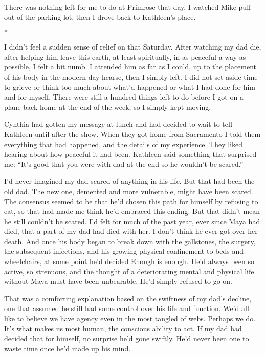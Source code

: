 \documentclass[12pt]{book}
\begin{document}
There was nothing left for me to do at Primrose that day. I watched Mike pull out of the parking lot, then I drove back to Kathleen's place.

\begin{center}$*$\end{center}

I didn't feel a sudden sense of relief on that Saturday. After watching my dad die, after helping him leave this earth, at least spiritually, in as peaceful a way as possible, I felt a bit numb. I attended him as far as I could, up to the placement of his body in the modern-day hearse, then I simply left. I did not set aside time to grieve or think too much about what'd happened or what I had done for him and for myself. There were still a hundred things left to do before I got on a plane back home at the end of the week, so I simply kept moving.

Cynthia had gotten my message at lunch and had decided to wait to tell Kathleen until after the show. When they got home from Sacramento I told them everything that had happened, and the details of my experience. They liked hearing about how peaceful it had been. Kathleen said something that surprised me: ``It's good that you were with dad at the end so he wouldn't be scared.''

I'd never imagined my dad scared of anything in his life. But that had been the old dad. The new one, demented and more vulnerable, might have been scared. The consensus seemed to be that he'd chosen this path for himself by refusing to eat, so that had made me think he'd embraced this ending. But that didn't mean he still couldn't be scared. I'd felt for much of the past year, ever since Maya had died, that a part of my dad had died with her. I don't think he ever got over her death. And once his body began to break down with the gallstones, the surgery, the subsequent infections, and his growing physical confinement to beds and wheelchairs, at some point he'd decided Enough is enough. He'd always been so active, so strenuous, and the thought of a deteriorating mental and physical life without Maya must have been unbearable. He'd simply refused to go on.

That was a comforting explanation based on the swiftness of my dad's decline, one that assumed he still had some control over his life and function. We'd all like to believe we have agency even in the most tangled of webs. Perhaps we do. It's what makes us most human, the conscious ability to act. If my dad had decided that for himself, no surprise he'd gone swiftly. He'd never been one to waste time once he'd made up his mind.
\end{document}
